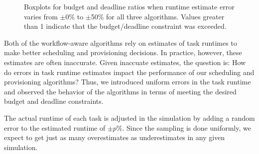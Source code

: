 \documentclass[conference]{IEEEtran}
\begin{document}
\begin{figure}[tb]
    \centering
    \hspace{2cm}
    \caption{Boxplots for budget and deadline ratios when runtime estimate 
    error varies from $\pm$0\% to $\pm$50\% for all three algorithms. Values 
    greater than 1 indicate that the budget/deadline constraint was exceeded.}
    \label{fig:variances}
\end{figure}

Both of the workflow-aware algorithms rely on estimates of task runtimes to
make better scheduling and provisioning decisions. In practice, however, these
estimates are often inaccurate. Given inaccuate estimates, the question is:
How do errors in task runtime estimates impact the performance of our
scheduling and provisioning algorithms?  Thus, we introduced uniform errors in the task runtime
and observed the behavior of the algorithms in terms of meeting  the desired budget and deadline constraints.

The actual runtime of each task is adjusted in the simulation by adding a
random error to the estimated runtime of $\pm p\%$. Since the sampling is done
uniformly, we expect to get just as many overestimates as underestimates in
any given simulation.
\end{document}
